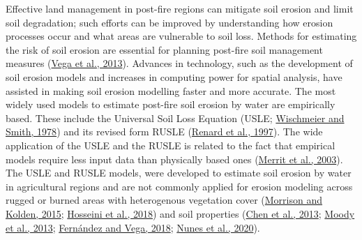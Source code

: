 \documentclass[
]{article}
\begin{document}
Effective land management in post-fire regions can mitigate soil erosion and limit soil degradation; such efforts can be improved by understanding how erosion processes occur and what areas are vulnerable to soil loss. Methods for estimating the risk of soil erosion are essential for planning post-fire soil management measures (\href{https://www.jstor.org/stable/42952602}{Vega et al., 2013}). Advances in technology, such as the development of soil erosion models and increases in computing power for spatial analysis, have assisted in making soil erosion modelling faster and more accurate. The most widely used models to estimate post-fire soil erosion by water are empirically based. These include the Universal Soil Loss Equation (USLE; \href{https://naldc.nal.usda.gov/download/CAT79706928/PDF}{Wischmeier and Smith, 1978}) and its revised form RUSLE (\href{https://www.ars.usda.gov/ARSUserFiles/64080530/RUSLE/AH_703.pdf}{Renard et al., 1997}). The wide application of the USLE and the RUSLE is related to the fact that empirical models require less input data than physically based ones (\href{https://www.researchgate.net/publication/228552294_A_Review_of_Erosion_and_Sediment_Transport_Models}{Merrit et al., 2003}). The USLE and RUSLE models, were developed to estimate soil erosion by water in agricultural regions and are not commonly applied for erosion modeling across rugged or burned areas with heterogenous vegetation cover (\href{https://www.researchgate.net/publication/270163637_Modeling_the_impacts_of_wildfire_on_runoff_and_pollutant_transport_from_coastal_watersheds_to_the_nearshore_environment}{Morrison and Kolden, 2015}; \href{https://www.mdpi.com/2073-4441/12/7/1995/htm}{Hosseini et al., 2018}) and soil properties (\href{https://www.sciencedirect.com/science/article/pii/S2666683921000365}{Chen et al., 2013}; \href{https://www.researchgate.net/publication/307181869_Synthesis_of_soil-hydraulic_properties_and_infiltration_timescales_in_wildfire-affected_soils_Synthesis_of_soil-hydraulic_properties_in_wildfire-affected_soils}{Moody et al., 2013}; \href{https://www.sciencedirect.com/science/article/pii/S0013935117317644}{Fernández and Vega, 2018}; \href{https://www.sciencedirect.com/science/article/pii/S0016706119329052}{Nunes et al., 2020}).
\end{document}
